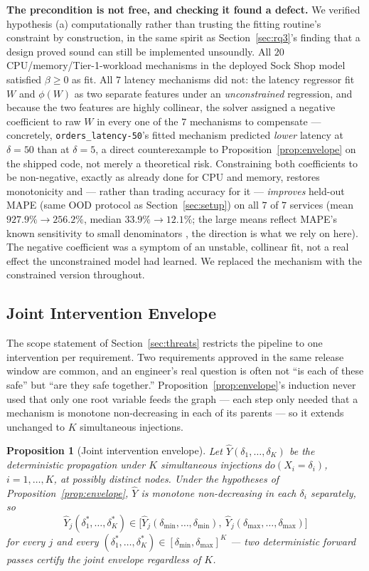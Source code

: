 \documentclass[journal, 10pt]{IEEEtran}
\newtheorem{proposition}{Proposition}
\begin{document}
\textbf{The precondition is not free, and checking it found a defect.} We
verified hypothesis (a) computationally rather than trusting the fitting
routine's constraint by construction, in the same spirit as
Section~\ref{sec:rq3}'s finding that a design proved sound can still be
implemented unsoundly. All $20$ CPU/memory/Tier-1-workload mechanisms in the
deployed Sock Shop model satisfied $\beta\geq0$ as fit. All $7$ latency
mechanisms did not: the latency regressor fit $W$ and $\phi(W)$ as two separate
features under an \emph{unconstrained} regression, and because the two features
are highly collinear, the solver assigned a negative coefficient to raw $W$ in
every one of the $7$ mechanisms to compensate --- concretely,
\texttt{orders\_latency-50}'s fitted mechanism predicted \emph{lower} latency at
$\delta=50$ than at $\delta=5$, a direct counterexample to
Proposition~\ref{prop:envelope} on the shipped code, not merely a theoretical
risk. Constraining both coefficients to be non-negative, exactly as already done
for CPU and memory, restores monotonicity and --- rather than trading accuracy
for it --- \emph{improves} held-out MAPE (same OOD protocol as
Section~\ref{sec:setup}) on all $7$ of $7$ services (mean $927.9\%\to256.2\%$,
median $33.9\%\to12.1\%$; the large means reflect MAPE's known sensitivity to
small denominators \cite{hyndman2006accuracy}, the direction is what we rely on
here). The negative coefficient was a symptom of an unstable, collinear fit, not
a real effect the unconstrained model had learned. We replaced the mechanism
with the constrained version throughout.

\subsection{Joint Intervention Envelope}
\label{sec:joint-envelope}
The scope statement of Section~\ref{sec:threats} restricts the pipeline to one
intervention per requirement. Two requirements approved in the same release
window are common, and an engineer's real question is often not ``is each of
these safe'' but ``are they safe together.'' Proposition~\ref{prop:envelope}'s
induction never used that only one root variable feeds the graph --- each step
only needed that a mechanism is monotone non-decreasing in each of its parents
--- so it extends unchanged to $K$ simultaneous injections.

\begin{proposition}[Joint intervention envelope]
\label{prop:joint}
Let $\hat{Y}(\delta_1,\ldots,\delta_K)$ be the deterministic propagation under
$K$ simultaneous injections $do(X_i{=}\delta_i)$, $i=1,\ldots,K$, at possibly
distinct nodes. Under the hypotheses of Proposition~\ref{prop:envelope},
$\hat{Y}$ is monotone non-decreasing in each $\delta_i$ separately, so
\begin{equation}
\hat{Y}_j(\delta_1^*,\ldots,\delta_K^*) \in \big[\hat{Y}_j(\delta_{\min},\ldots,\delta_{\min}),\ \hat{Y}_j(\delta_{\max},\ldots,\delta_{\max})\big]
\end{equation}
for every $j$ and every $(\delta_1^*,\ldots,\delta_K^*)\in[\delta_{\min},\delta_{\max}]^K$
--- two deterministic forward passes certify the joint envelope regardless of
$K$.
\end{proposition}
\end{document}
